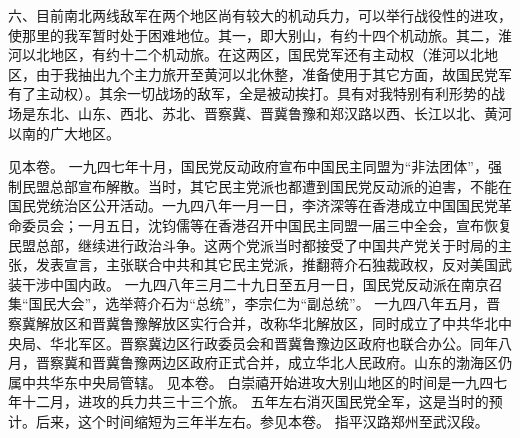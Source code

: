 六、目前南北两线敌军在两个地区尚有较大的机动兵力，可以举行战役性的进攻，使那里的我军暂时处于困难地位。其一，即大别山，有约十四个机动旅。其二，淮河以北地区，有约十二个机动旅。在这两区，国民党军还有主动权（淮河以北地区，由于我抽出九个主力旅开至黄河以北休整，准备使用于其它方面，故国民党军有了主动权）。其余一切战场的敌军，全是被动挨打。具有对我特别有利形势的战场是东北、山东、西北、苏北、晋察冀、晋冀鲁豫和郑汉路以西、长江以北、黄河以南的广大地区。


\begin{maonote}
见本卷。
一九四七年十月，国民党反动政府宣布中国民主同盟为“非法团体”，强制民盟总部宣布解散。当时，其它民主党派也都遭到国民党反动派的迫害，不能在国民党统治区公开活动。一九四八年一月一日，李济深等在香港成立中国国民党革命委员会；一月五日，沈钧儒等在香港召开中国民主同盟一届三中全会，宣布恢复民盟总部，继续进行政治斗争。这两个党派当时都接受了中国共产党关于时局的主张，发表宣言，主张联合中共和其它民主党派，推翻蒋介石独裁政权，反对美国武装干涉中国内政。
一九四八年三月二十九日至五月一日，国民党反动派在南京召集“国民大会”，选举蒋介石为“总统”，李宗仁为“副总统”。
一九四八年五月，晋察冀解放区和晋冀鲁豫解放区实行合并，改称华北解放区，同时成立了中共华北中央局、华北军区。晋察冀边区行政委员会和晋冀鲁豫边区政府也联合办公。同年八月，晋察冀和晋冀鲁豫两边区政府正式合并，成立华北人民政府。山东的渤海区仍属中共华东中央局管辖。
见本卷。
白崇禧开始进攻大别山地区的时间是一九四七年十二月，进攻的兵力共三十三个旅。
五年左右消灭国民党全军，这是当时的预计。后来，这个时间缩短为三年半左右。参见本卷。
指平汉路郑州至武汉段。
\end{maonote}

